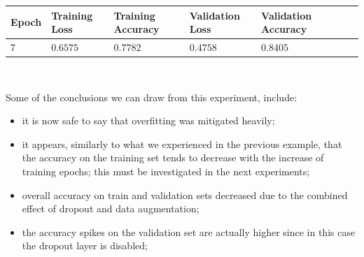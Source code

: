 \documentclass[11pt,a4paper]{article}
\begin{document}
\begin{center}
\begin{tabular}{|p{1.2cm}|p{1.8cm}|p{2cm}|p{2cm}|p{2cm}|p{2cm}|p{2cm}|}
\rowcolor{gray!50}
\hline
\textbf{Epoch} & \textbf{Training Loss} & \textbf{Training Accuracy} & \textbf{Validation Loss} & \textbf{Validation Accuracy}\\
\hline
$7$ & $0.6575$ & $0.7782$ & $0.4758$ & $0.8405$\\
\hline
\end{tabular}\\
\end{center}
Some of the conclusions we can draw from this experiment, include:
\begin{itemize}
    \item it is now safe to say that overfitting was mitigated heavily;
    \item it appears, similarly to what we experienced in the previous example, that the accuracy on the training set tends to decrease with the increase of training epochs; this must be investigated in the next experiments;
    \item overall accuracy on train and validation sets decreased due to the combined effect of dropout and data augmentation;
    \item the accuracy spikes on the validation set are actually higher since in this case the dropout layer is disabled;
\end{itemize}
\end{document}
